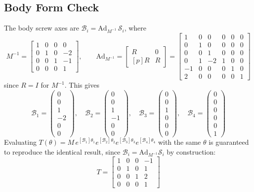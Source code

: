 \documentclass[11pt]{article}
\begin{document}
\subsection*{Body Form Check}
The body screw axes are $\mathcal B_i = \mathrm{Ad}_{M^{-1}}\,\mathcal S_i$, where
\[
M^{-1} = \begin{bmatrix}1&0&0&0\\0&1&0&-2\\0&0&1&-1\\0&0&0&1\end{bmatrix}, \qquad
\mathrm{Ad}_{M^{-1}} = \begin{bmatrix}R&0\\ [p]R & R\end{bmatrix}
= \begin{bmatrix}1&0&0&0&0&0\\0&1&0&0&0&0\\0&0&1&0&0&0\\0&1&-2&1&0&0\\-1&0&0&0&1&0\\2&0&0&0&0&1\end{bmatrix}
\]
since $R=I$ for $M^{-1}$. This gives
\[
\mathcal B_1=\begin{pmatrix}0\\0\\1\\-2\\0\\0\end{pmatrix}, \quad
\mathcal B_2=\begin{pmatrix}0\\0\\1\\-1\\0\\0\end{pmatrix}, \quad
\mathcal B_3=\begin{pmatrix}0\\0\\1\\0\\0\\0\end{pmatrix}, \quad
\mathcal B_4=\begin{pmatrix}0\\0\\0\\0\\0\\1\end{pmatrix}
\]
Evaluating $T(\theta)=M\,e^{[\mathcal B_1]\theta_1}e^{[\mathcal B_2]\theta_2}e^{[\mathcal B_3]\theta_3}e^{[\mathcal B_4]\theta_4}$ with the same $\theta$ is guaranteed to reproduce the identical result, since $\mathcal B_i=\mathrm{Ad}_{M^{-1}}\mathcal S_i$ by construction:
\[
T = \begin{bmatrix}1&0&0&-1\\0&1&0&1\\0&0&1&2\\0&0&0&1\end{bmatrix}
\]
\end{document}
